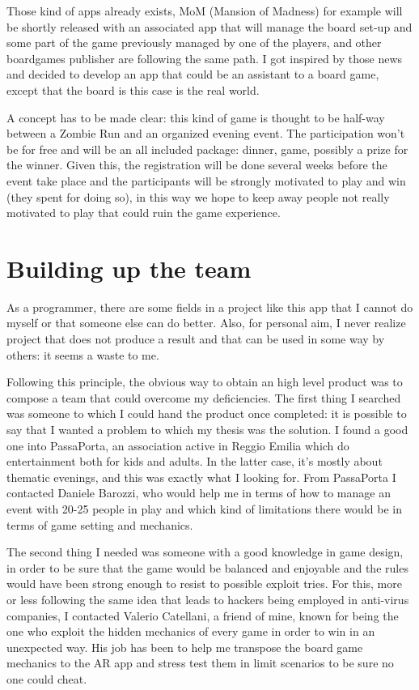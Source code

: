 		Those kind of apps already exists, MoM (Mansion of Madness) for example will be shortly released with an associated app that will manage the board set-up and some part of the game previously managed by one of the players, and other boardgames publisher are following the same path.
		I got inspired by those news and decided to develop an app that could be an assistant to a board game, except that the board is this case is the real world.
		
		A concept has to be made clear: this kind of game is thought to be half-way between a Zombie Run and an organized evening event.
		The participation won't be for free and will be an all included package: dinner, game, possibly a prize for the winner.
		Given this, the registration will be done several weeks before the event take place and the participants will be strongly motivated to play and win (they spent for doing so), in this way we hope to keep away people not really motivated to play that could ruin the game experience.
	
	\section{Building up the team}
		
		As a programmer, there are some fields in a project like this app that I cannot do myself or that someone else can do better.
		Also, for personal aim, I never realize project that does not produce a result and that can be used in some way by others: it seems a waste to me.
		
		Following this principle, the obvious way to obtain an high level product was to compose a team that could overcome my deficiencies.
		The first thing I searched was someone to which I could hand the product once completed: it is possible to say that I wanted a problem to which my thesis was the solution.
		I found a good one into PassaPorta, an association active in Reggio Emilia which do entertainment both for kids and adults.
		In the latter case, it's mostly about thematic evenings, and this was exactly what I looking for.
		From PassaPorta I contacted Daniele Barozzi, who would help me in terms of how to manage an event with 20-25 people in play and which kind of limitations there would be in terms of game setting and mechanics.
		
		The second thing I needed was someone with a good knowledge in game design, in order to be sure that the game would be balanced and enjoyable and the rules would have been strong enough to resist to possible exploit tries.
		For this, more or less following the same idea that leads to hackers being employed in anti-virus companies, I contacted Valerio Catellani, a friend of mine, known for being the one who exploit the hidden mechanics of every game in order to win in an unexpected way. His job has been to help me transpose the board game mechanics to the AR app and stress test them in limit scenarios to be sure no one could cheat.
		
